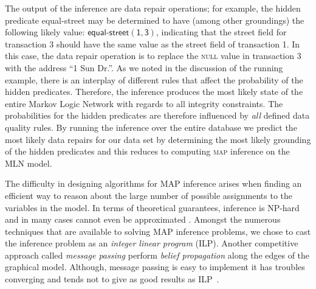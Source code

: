 The output of the inference are data repair operations; for example, the hidden predicate \textsf{equal-street} may be determined to have (among other groundings) the following likely value: $\mathsf{\textsf{equal-street}(1, 3)}$, indicating that the \textsf{street} field for transaction 3 should have the same value as the \textsf{street} field of transaction 1. In this case, the data repair operation is to replace the \textsc{null} value in transaction 3 with the address ``1 Sun Dr.''.  As we noted in the discussion of the running example, there is an interplay of different rules that affect the probability of the hidden predicates. Therefore, the inference produces the most likely state of the entire Markov Logic Network with regards to all integrity constraints. The probabilities for the hidden predicates are therefore influenced by \textit{all} defined data quality rules. By running the inference over the entire database we predict the most likely data repairs for our data set by determining the most likely grounding of the hidden predicates and this reduces to computing \textsc{map} inference on the MLN model.      

The difficulty in designing algorithms for MAP inference arises when finding an efficient way to reason about the large number of possible assignments to the variables in the model. In terms of theoretical guarantees, inference is NP-hard and in many cases cannot even be approximated . Amongst the numerous techniques that are available to solving MAP inference problems, we chose to cast the inference problem as an \emph{integer linear program} (ILP). Another competitive approach called \emph{message passing} perform \emph{belief propagation} along the edges of the graphical model. Although, message passing is easy to implement it has troubles converging \cite{schwing2011distributed, felzenszwalb2006efficient, pritch2009shift} and tends not to give as good results as ILP~\cite{NoessnerNS13}. 

